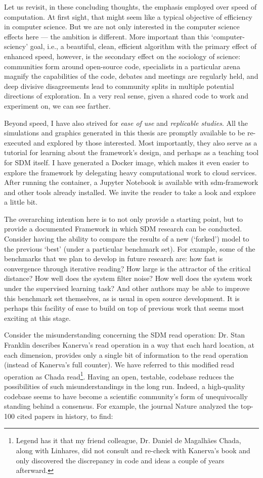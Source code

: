 Let us revisit, in these concluding thoughts, the emphasis employed over speed of computation.  At first sight, that might seem like a typical objective of efficiency in computer science. But we are not only interested in the computer science effects here --- the ambition is different. More important than this `computer-sciency' goal, i.e., a beautiful, clean, efficient algorithm with the primary effect of enhanced speed, however, is the secondary effect on the sociology of science:  communities form around open-source code, specialists in a particular arena magnify the capabilities of the code, debates and meetings are regularly held, and deep divisive disagreements lead to community splits in multiple potential directions of exploration.  In a very real sense, given a shared code to work and experiment on, we can see farther.

Beyond speed, I have also strived for \emph{ease of use} and \emph{replicable studies}.  All the simulations and graphics generated in this thesis are promptly available to be re-executed and explored by those interested. Most importantly, they also serve as a tutorial for learning about the framework's design, and perhaps as a teaching tool for SDM itself. I have generated a Docker image, which makes it even easier to explore the framework by delegating heavy computational work to cloud services. After running the container, a Jupyter Notebook is available with sdm-framework and other tools already installed. We invite the reader to take a look and explore a little bit.

The overarching intention here is to not only provide a starting point, but to provide a documented Framework in which SDM research can be conducted.  Consider having the ability to compare the results of a new (‘forked’) model to the previous `best' (under a particular benchmark set).  For example, some of the benchmarks that we plan to develop in future research are: how fast is convergence through iterative reading?  How large is the attractor of the critical distance?  How well does the system filter noise?  How well does the system work under the supervised learning task?  And other authors may be able to improve this benchmark set themselves, as is usual in open source development.  It is perhaps this facility of ease to build on top of previous work that seems most exciting at this stage.

Consider the misunderstanding concerning the SDM read operation:  Dr. Stan Franklin describes Kanerva's read operation in a way that each hard location, at each dimension, provides only a single bit of information to the read operation (instead of Kanerva's full counter).  We have referred to this modified read operation as Chada read\footnote{Legend has it that my friend \text{\&} colleague, Dr. Daniel de Magalhães Chada, along with Linhares, did not consult and re-check with Kanerva's book and only discovered the discrepancy in code and ideas a couple of years afterward.}.  Having an open, testable, codebase reduces the possibilities of such misunderstandings in the long run.  Indeed, a high-quality codebase seems to have become a scientific community's form of unequivocally standing behind a consensus. For example, the journal Nature analyzed the top-100 cited papers in history, to find:


